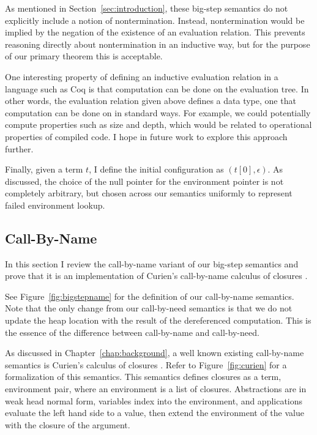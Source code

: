 As mentioned in Section~\ref{sec:introduction}, these big-step semantics do not
explicitly include a notion of nontermination. Instead, nontermination would be
implied by the negation of the existence of an evaluation relation. This
prevents reasoning directly about nontermination in an inductive way, but for
the purpose of our primary theorem this is acceptable. 

One interesting property of defining an inductive evaluation relation in a
language such as Coq is that computation can be done on the evaluation tree. In
other words, the evaluation relation given above defines a data type, one that
computation can be done on in standard ways. For example, we could potentially
compute properties such as size and depth, which would be related to operational
properties of compiled code. I hope in future work to explore this approach
further.

Finally, given a term $t$, I define the initial configuration as
$\left(t\left[0\right], \epsilon\right)$. As discussed, the choice of the null
pointer for the environment pointer is not completely arbitrary, but chosen
across our semantics uniformly to represent failed environment lookup. 

\subsection{Call-By-Name}

In this section I review the call-by-name variant of our big-step semantics and
prove that it is an implementation of Curien's call-by-name calculus of
closures \cite{curien1991abstract}. 

See Figure~\ref{fig:bigstepname} for the definition of our call-by-name
semantics. Note that the only change from our call-by-need semantics is that we
do not update the heap location with the result of the dereferenced computation.
This is the essence of the difference between call-by-name and call-by-need.

As discussed in Chapter~\ref{chap:background}, a well known existing
call-by-name semantics is Curien's calculus of closures
\cite{curien1991abstract}. Refer to Figure~\ref{fig:curien} for a formalization
of this semantics. This semantics defines closures as a term, environment pair,
where an environment is a list of closures. Abstractions are in weak head normal
form, variables index into the environment, and applications evaluate the left
hand side to a value, then extend the environment of the value with the closure
of the argument. 


